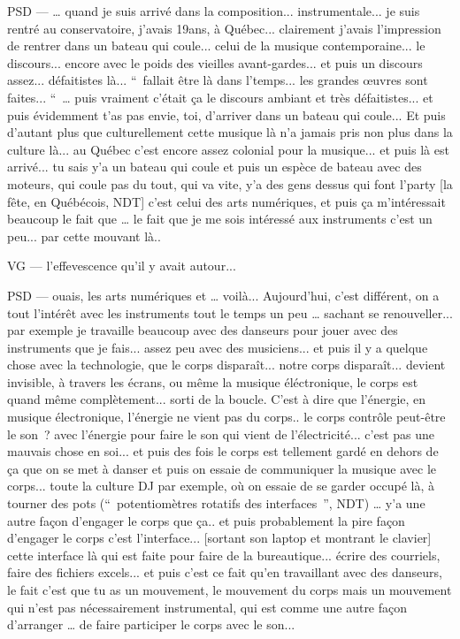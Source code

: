 PSD — … quand je suis arrivé dans la composition... instrumentale... je suis rentré au conservatoire, j'avais 19ans, à Québec... clairement j'avais l'impression de rentrer dans un bateau qui coule... celui de la musique contemporaine... le discours... encore avec le poids des vieilles avant-gardes... et puis un discours assez... défaitistes là... “ fallait être là dans l'temps... les grandes œuvres sont faites... “ … puis vraiment c'était ça le discours ambiant et très défaitistes... et puis évidemment t'as pas envie, toi, d'arriver dans un bateau qui coule... Et puis d'autant plus que culturellement cette musique là n'a jamais pris non plus dans la culture là... au Québec c'est encore assez colonial pour la musique... et puis là est arrivé... tu sais y'a un bateau qui coule et puis un espèce de bateau avec des moteurs, qui coule pas du tout, qui va vite, y'a des gens dessus qui font l'party [la fête, en Québécois, NDT] c'est celui des arts numériques, et puis ça m'intéressait beaucoup le fait que … le fait que je me sois intéressé aux instruments c'est un peu... par cette mouvant là.. 

VG —  l'effevescence qu'il y avait autour... 

PSD — ouais, les arts numériques et … voilà... Aujourd'hui, c'est différent, on a tout l'intérêt avec les instruments tout le temps un peu  … sachant se renouveller... par exemple je travaille beaucoup avec des danseurs pour jouer avec des instruments que je fais... assez peu avec des musiciens... et puis il y a quelque chose avec la technologie, que le corps disparaît... notre corps disparaît... devient invisible, à travers les écrans, ou même la musique éléctronique, le corps est quand même complètement... sorti de la boucle. C'est à dire que l'énergie, en musique électronique, l'énergie ne vient pas du corps.. le corps contrôle peut-être le son ? avec l'énergie pour faire le son qui vient de l'électricité... c'est pas une mauvais chose en soi... et puis des fois le corps est tellement gardé en dehors de ça que on se met à danser et puis on essaie de communiquer la musique avec le corps... toute la culture DJ par exemple, où on essaie de se garder occupé là, à tourner des pots (“ potentiomètres rotatifs des interfaces ”, NDT) … y'a une autre façon d'engager le corps que ça.. et puis probablement la pire façon d'engager le corps c'est l'interface... [sortant son laptop et montrant le clavier] cette interface là qui est faite pour faire de la bureautique... écrire des courriels, faire des  fichiers excels... et puis c'est ce fait qu'en travaillant avec des danseurs, le fait c'est que tu as un mouvement, le mouvement du corps mais un mouvement qui n'est pas nécessairement instrumental, qui est comme une autre façon d'arranger … de faire participer le corps avec le son... 

